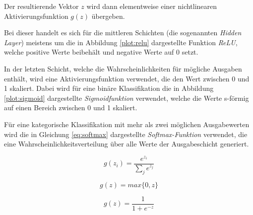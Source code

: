 Der resultierende Vektor $z$ wird dann elementweise
einer nichtlinearen Aktivierungsfunktion $g(z)$ übergeben.

Bei dieser handelt es sich für die mittleren Schichten 
(die sogenannten \textit{Hidden Layer})
meistens um die in Abbildung \ref{plot:relu} dargestellte
Funktion \textit{ReLU}, welche positive Werte beibehält und negative 
Werte auf 0 setzt.

In der letzten Schicht, welche die Wahrscheinlichkeiten 
für mögliche Ausgaben enthält, wird eine Aktivierungsfunktion
verwendet, die den Wert zwischen 0 und 1 skaliert.
Dabei wird für eine binäre Klassifikation die 
in Abbildung \ref{plot:sigmoid} dargestellte \textit{Sigmoidfunktion}
verwendet, welche die Werte s-förmig auf einen Bereich zwischen 
0 und 1 skaliert.

Für eine kategorische Klassifikation 
mit mehr als zwei möglichen Ausgabewerten
wird die in Gleichung 
\ref{eq:softmax} dargestellte \textit{Softmax-Funktion} 
verwendet, die eine
Wahrscheinlichkeitsverteilung über alle Werte
der Ausgabeschicht generiert.

\begin{equation}
    \label{eq:softmax}
    g(z_{i}) = \frac{e^{z_{i}}}{\sum_{j} e^{z_{j}}}
\end{equation}
\begin{minipage}{0.5\textwidth}
    \centering
    \begin{equation*}
        \label{eq:relu}
        g(z) = max\{0,z\}
    \end{equation*}
\end{minipage}
\vspace{1cm}
\begin{minipage}{0.5\textwidth}
    \centering
    \begin{equation*}
        \label{eq:sidmoid}
        g(z) = \frac{1}{1 + e^{-z}}
    \end{equation*}    
\end{minipage}
\begin{minipage}{0.5\textwidth}
    \centering
    
    \label{plot:relu}
\end{minipage}
\begin{minipage}{0.5\textwidth}
    \centering
    
    \label{plot:sigmoid}
\end{minipage}
\vspace{1cm}


